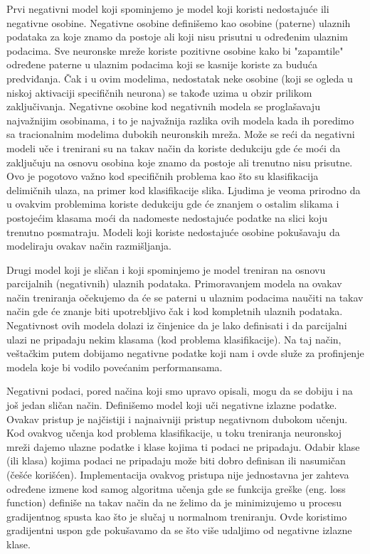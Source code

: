 Prvi negativni model koji spominjemo je model koji koristi nedostajuće ili negativne osobine. \cite{milovsevic2019classification} Negativne osobine definišemo kao osobine (paterne) ulaznih podataka za koje znamo da postoje ali koji nisu prisutni u određenim ulaznim podacima. Sve neuronske mreže koriste pozitivne osobine kako bi "zapamtile" određene paterne u ulaznim podacima koji se kasnije koriste za buduća predviđanja. Čak i u ovim modelima, nedostatak neke osobine (koji se ogleda u niskoj aktivaciji specifičnih neurona) se takođe uzima u obzir prilikom zaključivanja. Negativne osobine kod negativnih modela se proglašavaju najvažnijim osobinama, i to je najvažnija razlika ovih modela kada ih poredimo sa tracionalnim modelima dubokih neuronskih mreža. Može se reći da negativni modeli uče i trenirani su na takav način da koriste dedukciju gde će moći da zaključuju na osnovu osobina koje znamo da postoje ali trenutno nisu prisutne. Ovo je pogotovo važno kod specifičnih problema kao što su klasifikacija delimičnih ulaza, na primer kod klasifikacije slika. Ljudima je veoma prirodno da u ovakvim problemima koriste dedukciju gde će znanjem o ostalim slikama i postojećim klasama moći da nadomeste nedostajuće podatke na slici koju trenutno posmatraju. Modeli koji koriste nedostajuće osobine pokušavaju da modeliraju ovakav način razmišljanja.

Drugi model koji je sličan i koji spominjemo je model treniran na osnovu parcijalnih (negativnih) ulaznih podataka. Primoravanjem modela na ovakav način treniranja očekujemo da će se paterni u ulaznim podacima naučiti na takav način gde će znanje biti upotrebljivo čak i kod kompletnih ulaznih podataka. Negativnost ovih modela dolazi iz činjenice da je lako definisati i da parcijalni ulazi ne pripadaju nekim klasama (kod problema klasifikacije). Na taj način, veštačkim putem dobijamo negativne podatke koji nam i ovde služe za profinjenje modela koje bi vodilo povećanim performansama. 

Negativni podaci, pored načina koji smo upravo opisali, mogu da se dobiju i na još jedan sličan način. Definišemo model koji uči negativne izlazne podatke. Ovakav pristup je najčistiji i najnaivniji pristup negativnom dubokom učenju. Kod ovakvog učenja kod problema klasifikacije, u toku treniranja neuronskoj mreži dajemo ulazne podatke i klase kojima ti podaci ne pripadaju. Odabir klase (ili klasa) kojima podaci ne pripadaju može biti dobro definisan ili nasumičan (češće korišćen). Implementacija ovakvog pristupa nije jednostavna jer zahteva određene izmene kod samog algoritma učenja gde se funkcija greške (eng. loss function) definiše na takav način da ne želimo da je minimizujemo u procesu gradijentnog spusta kao što je slučaj u normalnom treniranju. Ovde koristimo gradijentni uspon gde pokušavamo da se što više udaljimo od negativne izlazne klase.


